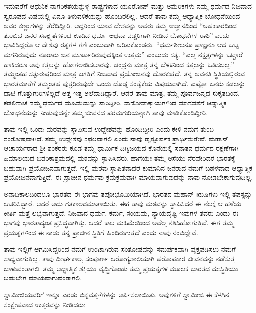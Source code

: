 ಇದುವರೆಗೆ ಆಧುನಿಕ ನಾಗರಿಕತೆಯನ್ನುಳ್ಳ ರಾಷ್ಟ್ರಗಳಾದ ಯೂರೋಪ್​ ಮತ್ತು ಅಮೆರಿಕಗಳು ನಮ್ಮ ಧರ್ಮದ ನಿಜವಾದ ಸ್ವರೂಪದ ವಿಷಯಲ್ಲಿ ಏನೂ ತಿಳುವಳಿಕೆಯನ್ನು ಹೊಂದಿರಲಿಲ್ಲ. ಆದರೆ ತಾವು ತಮ್ಮ ಆಧ್ಯಾತ್ಮಿಕ ಬೋಧನೆಯಿಂದ ಅವರ ಕಣ್ಣುಗಳನ್ನು ತೆರೆದಿದ್ದೀರಿ. ಆದ್ದರಿಂದ ಯಾವ ದೇಶವನ್ನು ಅವರು ತಮ್ಮ ಅಜ್ಞಾನದಿಂದ “ಅಹಂಕಾರದಿಂದ ತುಂಬಿದ ಜನರ ಸೂಕ್ಷ್ಮತೆಗಳಿಂದ ಕೂಡಿದ ಧರ್ಮ ಅಥವಾ ದಡ್ಡರಿಗಾಗಿ ನೀಡಿದ ಬೋಧನೆಗಳ ರಾಶಿ” ಎಂದು ಭಾವಿಸಿದ್ದರೊ ಆ ದೇಶವು ರತ್ನಗಳ ಗಣಿ ಎಂಬುದಾಗಿ ಅರಿತುಕೊಂಡರು. “ಧರ್ಮಶೀಲನೂ ಪ್ರಾಜ್ಞನೂ ಆದ ಒಬ್ಬ ಮಗನಿರುವುದು ನೂರಾರು ಜನ ಮೂರ್ಖರಿರುವುದಕ್ಕಿಂತ ಉತ್ತಮ” ಎಂಬುದು ಸತ್ಯ. “ಎಲ್ಲ ನಕ್ಷತ್ರಗಳನ್ನು ಒಟ್ಟಾರೆ ಹಾಕಿದರೂ ಅವು ಕತ್ತಲನ್ನು ಹೋಗಲಾಡಿಸಲಾರವು. ಚಂದ್ರನು ಮಾತ್ರ ತನ್ನ ಬೆಳಕಿನಿಂದ ಕತ್ತಲನ್ನು ಓಡಿಸಬಲ್ಲ.” ತಮ್ಮಂತಹ ಸತ್ಪುರುಷರಿಂದ ಮಾತ್ರ ಜಗತ್ತಿಗೆ ನಿಜವಾದ ಪ್ರಯೋಜನವು ದೊರಕುತ್ತದೆ. ತನ್ನ ಅವನತಿ ಸ್ಥಿತಿಯಲ್ಲಿರುವ ಭಾರತಮಾತೆಗೆ ತಮ್ಮಂತಹ ಪುತ್ರರಿರುವುದೇ ಒಂದು ದೊಡ್ಡ ಸಂತೈಕೆಯ ವಿಷಯವಾಗಿದೆ. ಎಷ್ಟೋ ಜನರು ಕಡಲನ್ನು ದಾಟಿ ಗೊತ್ತುಗುರಿಗಳಿಲ್ಲದೆ ಅತ್ತ ಇತ್ತ ಅಲೆದಾಡಿದ್ದಾರೆ. ಆದರೆ ತಾವು ಮಾತ್ರ, ತಮ್ಮ ಪೂರ್ವಜನ್ಮದ ಸುಕೃತದಿಂದ, ಕಡಲಿನಾಚೆ ನಮ್ಮ ಧರ್ಮದ ಮಹಿಮೆಯನ್ನು ಸಾರಿದ್ದೀರಿ. ಮನೋವಾಕ್ಕಾಯಗಳಿಂದ ಮಾನವತೆಗೆ ಆಧ್ಯಾತ್ಮಿಕ ಬೋಧನೆಯನ್ನು ನೀಡುವುದನ್ನೇ ತಮ್ಮ ಜೀವನದ ಪರಮಗುರಿಯನ್ನಾಗಿ ತಾವು ಮಾಡಿಕೊಂಡಿದ್ದೀರಿ.

\vskip 6pt

ತಾವು ಇಲ್ಲಿ ಒಂದು ಮಠವನ್ನು ಸ್ಥಾಪಿಸುವ ಉದ್ದೇಶವನ್ನು ಹೊಂದಿದ್ದೀರಿ ಎಂದು ಕೇಳಿ ನಮಗೆ ತುಂಬ ಸಂತೋಷವಾಗಿದೆ. ತಮ್ಮ ಉದ್ದೇಶವು ಸಫಲವಾಗಲಿ ಎಂದು ನಾವು ಹೃತ್ಪೂರ್ವಕ ಪ್ರಾರ್ಥಿಸುತ್ತೇವೆ. ಮಹಾನ್​ ಆಚಾರ್ಯರಾದ ಶ‍್ರೀ ಶಂಕರರು ಕೂಡ ತಮ್ಮ ಧಾರ್ಮಿಕ ದಿಗ್ವಿಜಯದ ಕೊನೆಯಲ್ಲಿ ಸನಾತನ ಧರ್ಮದ ರಕ್ಷಣೆಗಾಗಿ ಹಿಮಾಲಯದ ಬದರಿಕಾಶ್ರಮದಲ್ಲಿ ಮಠವನ್ನು ಸ್ಥಾಪಿಸಿದರು. ಹಾಗೆಯೇ ತಮ್ಮ ಆಸೆಯು ನೆರವೇರಿದರೆ ಭಾರತಕ್ಕೆ ಬಹುವಾಗಿ ಪ್ರಯೋಜನವಾಗುತ್ತದೆ. ಇಲ್ಲಿ ಮಠವು ಸ್ಥಾಪಿತವಾದರೆ ಕುಮಾನಿನ ಜನರಾದ ನಮಗೆ ಬಹಳವಾದ ಆಧ್ಯಾತ್ಮಿಕ ಪ್ರಯೋಜನವಾಗುತ್ತಿದೆ. ಈ ಪ್ರಾಚೀನ ಧರ್ಮವು ಕ್ರಮಕ್ರಮವಾಗಿ ಮಾಯವಾಗುವುದನ್ನು ನಾವು ನೋಡಬೇಕಾಗುವುದಿಲ್ಲ.

\newpage

ಅನಾದಿಕಾಲದಿಂದಲೂ ಭಾರತದ ಈ ಭಾಗವು ತಪೋಭೂಮಿಯಾಗಿದೆ. ಭಾರತದ ಮಹಾನ್​ ಋಷಿಗಳು ಇಲ್ಲಿ ತಪಸ್ಸನ್ನು ಆಚರಿಸಿದ್ದಾರೆ. ಆದರೆ ಅದು ಗತಕಾಲದ\break ಮಾತಾಯಿತು. ಈಗ ತಾವು ಮಠವನ್ನು ಸ್ಥಾಪಿಸಿದರೆ ಈ ನೆಲಕ್ಕೆ ಆ ಹಳೆಯ ಕೀರ್ತಿ ಮತ್ತೆ ಲಭ್ಯವಾಗುತ್ತದೆ. ನಿಜವಾದ ಧರ್ಮ, ಕರ್ಮ, ಸಂಯಮ, ನ್ಯಾಯದೃಷ್ಟಿ ಇವುಗಳ ತವರು ಎಂದು ಈ ಭಾಗವು ಭಾರತಾದ್ಯಂತ ಪ್ರಸಿದ್ಧವಾಗಿತ್ತು. ಆದರೆ ಕಾಲ ಮಹಿಮೆಯಿಂದ ಅವೆಲ್ಲ ನಶಿಸಿಹೋಗುತ್ತಿವೆ. ಈಗ ತಮ್ಮ ಪ್ರಯತ್ನಗಳಿಂದ ಈ ನಾಡು ತನ್ನ ಪ್ರಾಚೀನ ಸ್ಥಿತಿಗೆ ಹಿಂದಿರುಗುತ್ತದೆ ಎಂದು ನಾವು ನಂಬಿದ್ದೇವೆ.

\vskip 4pt

ತಾವು ಇಲ್ಲಿಗೆ ಆಗಮಿಸಿದ್ದರಿಂದ ನಮಗೆ ಉಂಟಾಗಿರುವ ಸಂತೋಷವನ್ನು ಸಮರ್ಪಕವಾಗಿ ವ್ಯಕ್ತಪಡಿಸಲು ನಮಗೆ ಸಾಧ್ಯವಾಗುತ್ತಿಲ್ಲ. ತಾವು ದೀರ್ಘಕಾಲ, ಸಂಪೂರ್ಣ ಆರೋಗ್ಯಶಾಲಿಯಾಗಿ ಪರೋಪಕಾರ ಜೀವನವನ್ನು ನಡೆಸುತ್ತ ಬಾಳುವಂತಾಗಲಿ. ತಮ್ಮ ಆಧ್ಯಾತ್ಮಿಕ ಶಕ್ತಿಯು ವೃದ್ಧಿಗೊಂಡು ತಮ್ಮ ಪ್ರಯತ್ನಗಳ ಮೂಲಕ ಭಾರತದ ದುಃಸ್ಥಿತಿಯು ಬಹುಬೇಗ ಮಾಯವಾಗುವಂತಾಗಲಿ.

\vskip 5pt

ಸ್ವಾಮೀಜಿಯವರಿಗೆ ಇನ್ನೂ ಎರಡು ಬಿನ್ನವತ್ತಳೆಗಳನ್ನು ಅರ್ಪಿಸಲಾಯಿತು. ಅವುಗಳಿಗೆ ಸ್ವಾಮೀಜಿ ಈ ಕೆಳಗಿನ ಸಂಕ್ಷೇಪವಾದ ಉತ್ತರವನ್ನು ನೀಡಿದರು:

